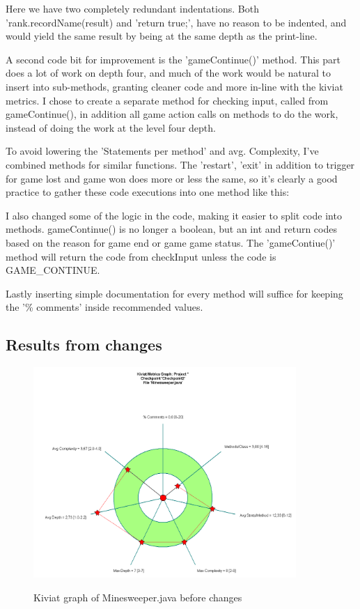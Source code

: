 \documentclass[UKenglish]{article}  %
\begin{document}
Here we have two completely redundant indentations. Both 
'rank.recordName(result) and 'return true;', have no reason to be indented, and 
would yield the same result by being at the same depth as the print-line. 

A second code bit for improvement is the 'gameContinue()' method. This part does
a lot of work on depth four, and much of the work would be natural to insert
into sub-methods, granting cleaner code and more in-line with the kiviat
metrics. I chose to create a separate method for checking input, called from
gameContinue(), in addition all game action calls on methods to do the work,
instead of doing the work at the level four depth. 

To avoid lowering the 'Statements per method' and avg. Complexity, I've
combined methods for similar functions. The 'restart', 'exit' in addition to
trigger for game lost and game won does more or less the same, so it's clearly a
good practice to gather these code executions into one method like this: 



I also changed some of the logic in the code, making it easier to split code
into methods. gameContinue() is no longer a boolean, but an int and return codes
based on the reason for game end or game game status. The 'gameContiue()' method
will return the code from checkInput unless the code is GAME\_CONTINUE.



Lastly inserting simple documentation for every method will suffice for keeping
the '\% comments' inside recommended values.



\subsection{Results from changes}
\begin{figure}
	\caption{Kiviat graph of Minesweeper.java before changes}
	\includegraphics[height=8cm]{kiviat_minesweeper_before}
	\label{minesweeper_before}
\end{figure}
\end{document}
